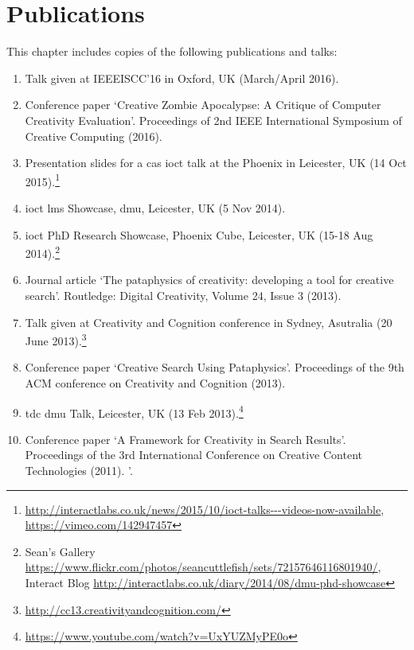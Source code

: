 
\chapter{Publications}
\label{app:pub}

This chapter includes copies of the following publications and talks:


\begin{enumerate}
  \item Talk given at IEEEISCC'16 in Oxford, UK (March/April 2016).
  \item Conference paper `Creative Zombie Apocalypse: A Critique of Computer Creativity Evaluation'. Proceedings of 2nd IEEE International Symposium of Creative Computing (2016).
  \item Presentation slides for a \gls{cas} \gls{ioct} talk at the Phoenix in Leicester, UK (14 Oct 2015).\footnote{\url{http://interactlabs.co.uk/news/2015/10/ioct-talks---videos-now-available}, \url{https://vimeo.com/142947457}}
  \item \gls{ioct} \gls{lms} Showcase, \gls{dmu}, Leicester, UK (5 Nov 2014).
  \item \gls{ioct} PhD Research Showcase, Phoenix Cube, Leicester, UK (15-18 Aug 2014).\footnote{Sean's Gallery \url{https://www.flickr.com/photos/seancuttlefish/sets/72157646116801940/}, Interact Blog \url{http://interactlabs.co.uk/diary/2014/08/dmu-phd-showcase}}
  \item Journal article `The pataphysics of creativity: developing a tool for creative search'. Routledge: Digital Creativity, Volume 24, Issue 3 (2013).
  \item Talk given at Creativity and Cognition conference in Sydney, Asutralia (20 June 2013).\footnote{\url{http://cc13.creativityandcognition.com/}}
  \item Conference paper `Creative Search Using Pataphysics'. Proceedings of the 9th ACM conference on Creativity and Cognition (2013).
  \item \gls{tdc} \gls{dmu} Talk, Leicester, UK (13 Feb 2013).\footnote{\url{https://www.youtube.com/watch?v=UxYUZMyPE0o}}
  \item Conference paper `A Framework for Creativity in Search Results'. Proceedings of the 3rd International Conference on Creative Content Technologies (2011).
'.
\end{enumerate}

\addtocounter{section}{1}



